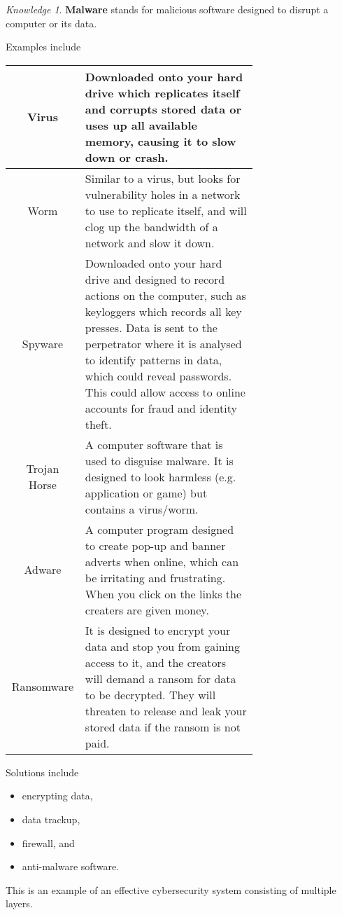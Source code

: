 \documentclass[8pt]{article}
\theoremstyle{remark}
\newtheorem{knowledge}{Knowledge}[subsection]
\begin{document}
            \begin{knowledge}
                \textbf{Malware} stands for malicious software designed to disrupt a computer or its data.

                Examples include
                \begin{center}
                    \begin{tabular}{c|p{0.7\linewidth}}
                        Virus & Downloaded onto your hard drive which replicates itself and corrupts stored data or uses up all available memory, causing it to slow down or crash.\\\hline
                        Worm & Similar to a virus, but looks for vulnerability holes in a network to use to replicate itself, and will clog up the bandwidth of a network and slow it down.\\\hline
                        Spyware & Downloaded onto your hard drive and designed to record actions on the computer, such as keyloggers which records all key presses. Data is sent to the perpetrator where it is analysed to identify patterns in data, which could reveal passwords. This could allow access to online accounts for fraud and identity theft.\\\hline
                        Trojan Horse & A computer software that is used to disguise malware. It is designed to look harmless (e.g. application or game) but contains a virus/worm.\\\hline
                        Adware & A computer program designed to create pop-up and banner adverts when online, which can be irritating and frustrating. When you click on the links the creaters are given money.\\\hline
                        Ransomware & It is designed to encrypt your data and stop you from gaining access to it, and the creators will demand a ransom for data to be decrypted. They will threaten to release and leak your stored data if the ransom is not paid.
                    \end{tabular}
                \end{center}
                
                Solutions include
                \begin{itemize}
                    \item encrypting data,
                    \item data trackup,
                    \item firewall, and
                    \item anti-malware software.
                \end{itemize}

                This is an example of an effective cybersecurity system consisting of multiple layers.
            \end{knowledge}
            
\end{document}
